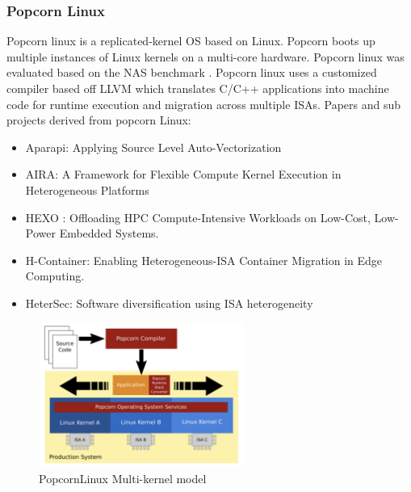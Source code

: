 \subsubsection{Popcorn Linux} %
Popcorn\cite{PopcornLinux} linux is a replicated-kernel OS based on Linux. Popcorn 
boots up multiple instances of Linux kernels on a 
multi-core hardware. Popcorn linux was evaluated 
based on the NAS benchmark \cite{NAS}. Popcorn 
linux uses a customized compiler based 
off LLVM which translates C/C++ applications 
into machine code for runtime execution and migration 
across multiple ISAs. Papers and sub projects 
derived from popcorn Linux: 
\begin{itemize}
  \item Aparapi: Applying Source Level Auto-Vectorization
  \item AIRA: A Framework for Flexible Compute Kernel Execution in Heterogeneous Platforms
  \item HEXO \cite{HEXO}: Offloading HPC Compute-Intensive Workloads on Low-Cost, Low-Power Embedded Systems.
  \item H-Container: Enabling Heterogeneous-ISA Container Migration in Edge Computing.
  \item HeterSec: Software diversification using ISA heterogeneity
\end{itemize}

\begin{figure}[htbp!] 
  \centering    
  \includegraphics[width=0.6\textwidth]{FigsMultikernel/popcornLinux}
  \caption[Multi-kernel]{PopcornLinux Multi-kernel model \cite{PopcornLinux}}
  \label{fig:PopcornLinux}
  \end{figure}





